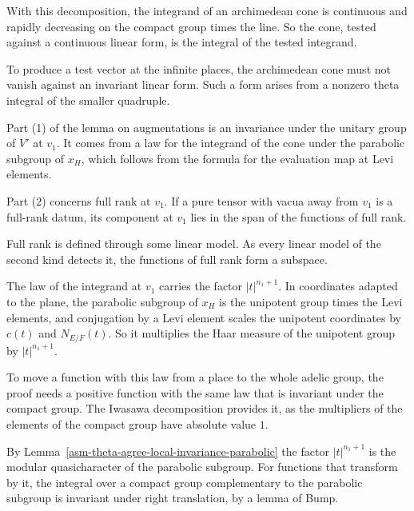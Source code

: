 With this decomposition, the integrand of an archimedean cone is continuous and
rapidly decreasing on the compact group times the line. So the cone, tested
against a continuous linear form, is the integral of the tested integrand.

To produce a test vector at the infinite places, the archimedean cone must
not vanish against an invariant linear form. Such a form arises from a
nonzero theta integral of the smaller quadruple.

Part (1) of the lemma on augmentations is an invariance under the unitary group
of $V'$ at $v_1$. It comes from a law for the integrand of the cone under the
parabolic subgroup of $x_H$, which follows from the formula for the evaluation
map at Levi elements.

Part (2) concerns full rank at $v_1$. If a pure tensor with vacua away from
$v_1$ is a full-rank datum, its component at $v_1$ lies in the span of the
functions of full rank.

Full rank is defined through some linear model. As every linear model of the
second kind detects it, the functions of full rank form a subspace.

The law of the integrand at $v_1$ carries the factor $|t|^{n_1+1}$. In
coordinates adapted to the plane, the parabolic subgroup of $x_H$ is the
unipotent group times the Levi elements, and conjugation by a Levi element
scales the unipotent coordinates by $c(t)$ and $N_{E/F}(t)$. So it multiplies the
Haar measure of the unipotent group by $|t|^{n_1+1}$.

To move a function with this law from a place to the whole adelic group, the
proof needs a positive function with the same law that is invariant under the
compact group. The Iwasawa decomposition provides it, as the multipliers of the
elements of the compact group have absolute value $1$.

By Lemma~\ref{asm-theta-agree-local-invariance-parabolic} the factor
$|t|^{n_1+1}$ is the modular quasicharacter of the parabolic subgroup. For functions that transform by it, the integral over a
compact group complementary to the parabolic subgroup is invariant under right
translation, by a lemma of Bump.

